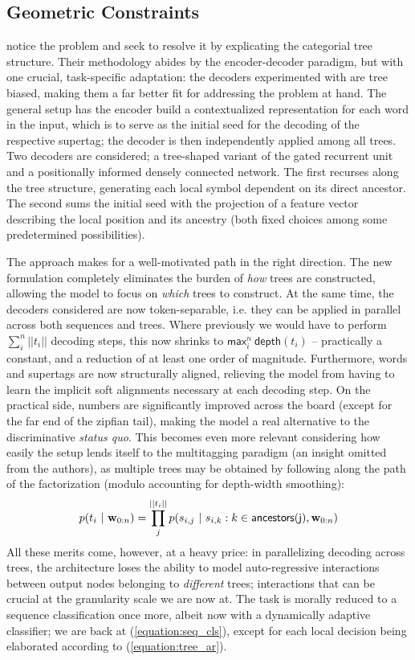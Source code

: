 \subsection{Geometric Constraints}
\citet{prange-etal-2021-supertagging} notice the problem and seek to resolve it by explicating the categorial tree structure.
Their methodology abides by the encoder-decoder paradigm, but with one crucial, task-specific adaptation: the decoders experimented with are tree biased, making them a far better fit for addressing the problem at hand.
The general setup has the encoder build a contextualized representation for each word in the input, which is to serve as the initial seed for the decoding of the respective supertag; the decoder is then independently applied among all trees.
Two decoders are considered; a tree-shaped variant of the gated recurrent unit~\cite{cho2014properties} and a positionally informed densely connected network.
The first recurses along the tree structure, generating each local symbol dependent on its direct ancestor.
The second sums the initial seed with the projection of a feature vector describing the local position and its ancestry (both fixed choices among some predetermined possibilities).

The approach makes for a well-motivated path in the right direction.
The new formulation completely eliminates the burden of \textit{how} trees are constructed, allowing the model to focus on \textit{which} trees to construct. 
At the same time, the decoders considered are now token-separable, i.e. they can be applied in parallel across both sequences and trees.
Where previously we would have to perform $\sum_i^n ||t_i||$ decoding steps, this now shrinks to $\mathsf{max}_i^n ~ \mathsf{depth}(t_i)$ -- practically a constant, and a reduction of at least one order of magnitude.
Furthermore, words and supertags are now structurally aligned, relieving the model from having to learn the implicit soft alignments necessary at each decoding step.
On the practical side, numbers are significantly improved across the board (except for the far end of the zipfian tail), making the model a real alternative to the discriminative \textit{status quo}.
This becomes even more relevant considering how easily the setup lends itself to the multitagging paradigm (an insight omitted from the authors), as multiple trees may be obtained by following along the path of the factorization (modulo accounting for depth-width smoothing):
\begin{equation}\label{equation:tree_ar}
	p(t_i \ | \ \mathbf{w}_{0:n}) = \prod_j^{||t_i||} p(s_{i,j} \ | \ s_{i,k} : k \in \mathsf{ancestors(j)}, \mathbf{w}_{0:n})
\end{equation}
All these merits come, however, at a heavy price: in parallelizing decoding across trees, the architecture loses the ability to model auto-regressive interactions between output nodes belonging to \textit{different} trees; interactions that can be crucial at the granularity scale we are now at.
The task is morally reduced to a sequence classification once more, albeit now with a dynamically adaptive classifier; we are back at (\ref{equation:seq_cls}), except for each local decision being elaborated according to (\ref{equation:tree_ar}).

